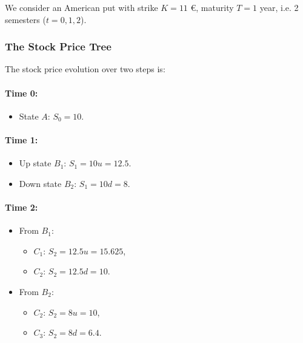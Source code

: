 \documentclass[12pt,a4paper]{article}
\theoremstyle{definition}
\begin{document}
We consider an American put with strike $K = 11$ €, maturity $T = 1$ year, i.e. 2 semesters ($t = 0, 1, 2$).

\subsubsection{The Stock Price Tree}

The stock price evolution over two steps is:

\paragraph{Time 0:}
\begin{itemize}
\item State $A$: $S_0 = 10$.
\end{itemize}

\paragraph{Time 1:}
\begin{itemize}
\item Up state $B_1$: $S_1 = 10u = 12.5$.
\item Down state $B_2$: $S_1 = 10d = 8$.
\end{itemize}

\paragraph{Time 2:}
\begin{itemize}
\item From $B_1$:
\begin{itemize}
\item $C_1$: $S_2 = 12.5u = 15.625$,
\item $C_2$: $S_2 = 12.5d = 10$.
\end{itemize}
\item From $B_2$:
\begin{itemize}
\item $C_2$: $S_2 = 8u = 10$,
\item $C_3$: $S_2 = 8d = 6.4$.
\end{itemize}
\end{itemize}

\begin{center}
\end{center}
\end{document}
